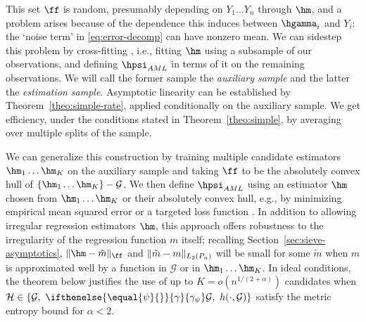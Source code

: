 \documentclass[aos,submission]{imsart}
\theoremstyle{plain}
\theoremstyle{remark}
\newcommand{\riesz}[1][]{\ifthenelse{\equal{#1}{}}{\gamma}{\gamma_{{#1}}}}
\newcommand{\HH}{\mathcal{H}}
\DeclarePairedDelimiter\norm{\lVert}{\rVert}
\DeclarePairedDelimiter\set{\{}{\}}
\newcommand{\GG}{\mathcal{G}}
\begin{document}
This set $\ff$ is random, presumably depending on $Y_1 \ldots Y_n$ through $\hm$,
and a problem arises because of the dependence this induces between $\hgamma_i$ and $Y_i$:
the `noise term' in \eqref{eq:error-decomp} can have nonzero mean. We can sidestep this problem by cross-fitting \citep{schick1986asymptotically}, i.e.,
fitting $\hm$ using a subsample of our observations, and defining $\hpsi_{AML}$ in terms of it on the remaining observations.
We will call the former sample the \emph{auxiliary sample} and the latter the \emph{estimation sample}. 
Asymptotic linearity can be established by Theorem~\ref{theo:simple-rate}, applied conditionally on the auxiliary sample.
We get efficiency, under the conditions stated in Theorem~\ref{theo:simple}, by averaging over multiple splits of the sample.

We can generalize this construction by training multiple candidate estimators $\hm_1 \ldots \hm_K$ on the auxiliary sample
and taking $\ff$ to be the absolutely convex hull of $\set{\hm_1 \ldots \hm_K} - \GG$.
We then define $\hpsi_{AML}$ using an estimator $\hm$ chosen from $\hm_1 \ldots \hm_K$ 
or their absolutely convex hull,
e.g., by minimizing empirical mean squared error or a targeted 
loss function \citep[see e.g.,][]{juditsky2000functional, van2003unified}. In addition 
to allowing irregular regression estimators $\hm$, this approach offers robustness to the irregularity 
of the regression function $m$ itself; recalling Section~\ref{sec:sieve-asymptotics}, 
$\norm{\hm - \tilde m}_{\ff}$ and $\norm{\tilde m - m}_{L_2(\Pn)}$
will be small for some $\tilde m$ when $m$ is approximated well by a function in $\GG$ or in $\hm_1 \ldots \hm_K$. 
In ideal conditions, the theorem below justifies the use of up to 
$K = o(n^{1/(2+\alpha)})$ candidates when $\HH \in \set{ \GG,\ \riesz[\psi]\GG,\ h(\cdot,\GG)}$
satisfy the metric entropy bound \smash{$\log \hat N(\HH,\tau) \le \tau^{-\alpha}$} for $\alpha < 2$. 
\end{document}
